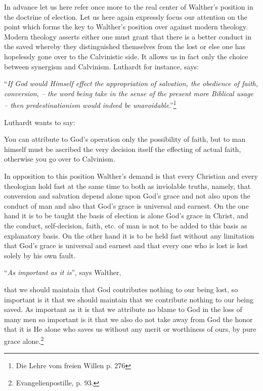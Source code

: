                 In advance let us here refer once more to the real center of Walther’s position in the doctrine of election.  Let us here again expressly focus our attention on the point which forms the key to Walther’s position over against modern theology.  Modern theology asserts either one must grant that there is a better conduct in the saved whereby they distinguished themselves from the lost or else one has hopelessly gone over to the Calvinistic side.  It allows us in fact only the choice between synergism and Calvinism.  Luthardt for instance, says: \begin{displayquote}“\textit{If God would Himself effect the appropriation of salvation, the obedience of faith, conversion, -- the word being take in the sense of the present more Biblical usage -- then predestinationism would indeed be unavoidable}.''\footnote{Die Lehre vom freien Willen p. 276}\end{displayquote}  Luthardt wants to say: \begin{displayquote}{\footnotesize You can attribute to God’s operation only the possibility of faith, but to man himself must be ascribed the very decision itself the effecting of actual faith, otherwise you go over to Calvinism.}\end{displayquote}  In opposition to this position Walther’s demand is that every Christian and every theologian hold fast at the same time to both as inviolable truths, namely, that conversion and salvation depend alone upon God’s grace and not also upon the conduct of man and also that God’s grace is universal and earnest.  On the one hand it is to be taught the basis of election is alone God’s grace in Christ, and the conduct, self-decision, faith, etc. of man is not to be added to this basis as explanatory basis.  On the other hand it is to be held fast without any limitation that God’s grace is universal and earnest and that every one who is lost is lost solely by his own fault.  \par “\textit{As important as it is}”, says Walther, \begin{fancyquotes}that we should maintain that God contributes nothing to our being lost, so important is it that we should maintain that we contribute nothing to our being saved.  As important as it is that we attribute no blame to God in the loss of many men so important is it that we also do not take away from God the honor that it is He alone who saves us without any merit or worthiness of ours, by pure grace alone.\footnote{Evangelienpostille, p. 93.}\end{fancyquotes}


